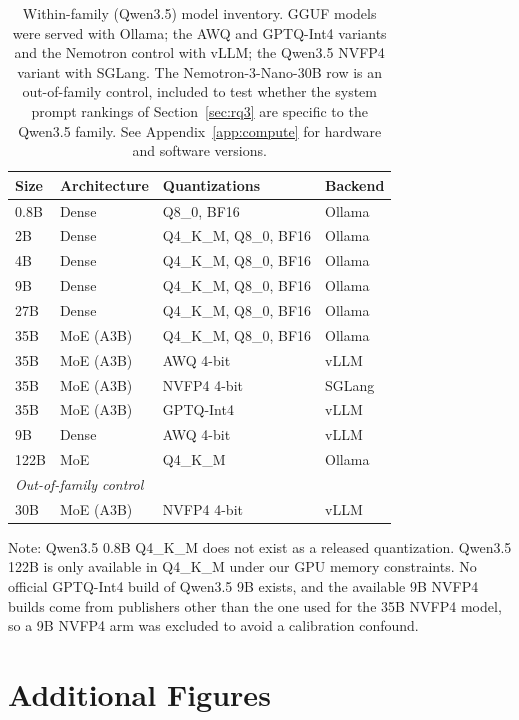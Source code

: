 \documentclass[11pt]{article}
\begin{document}
\begin{table}[h]
\centering
\caption{Within-family (Qwen3.5) model inventory. GGUF models were served with
  Ollama; the AWQ and GPTQ-Int4 variants and the Nemotron control with vLLM;
  the Qwen3.5 NVFP4 variant with SGLang. The Nemotron-3-Nano-30B row is an
  out-of-family control, included to
  test whether the system prompt rankings of Section~\ref{sec:rq3} are specific
  to the Qwen3.5 family. See Appendix~\ref{app:compute} for hardware and
  software versions.}
\label{tab:models_qwen35}
\small
\begin{tabular}{llll}
\toprule
Size & Architecture & Quantizations & Backend \\
\midrule
0.8B & Dense & Q8\_0, BF16 & Ollama \\
2B & Dense & Q4\_K\_M, Q8\_0, BF16 & Ollama \\
4B & Dense & Q4\_K\_M, Q8\_0, BF16 & Ollama \\
9B & Dense & Q4\_K\_M, Q8\_0, BF16 & Ollama \\
27B & Dense & Q4\_K\_M, Q8\_0, BF16 & Ollama \\
35B & MoE (A3B) & Q4\_K\_M, Q8\_0, BF16 & Ollama \\
35B & MoE (A3B) & AWQ 4-bit & vLLM \\
35B & MoE (A3B) & NVFP4 4-bit & SGLang \\
35B & MoE (A3B) & GPTQ-Int4 & vLLM \\
9B & Dense & AWQ 4-bit & vLLM \\
122B & MoE & Q4\_K\_M & Ollama \\
\midrule
\multicolumn{4}{l}{\emph{Out-of-family control}} \\
30B & MoE (A3B) & NVFP4 4-bit & vLLM \\
\bottomrule
\end{tabular}
\end{table}

Note: Qwen3.5 0.8B Q4\_K\_M does not exist as a released quantization.
Qwen3.5 122B is only available in Q4\_K\_M under our GPU memory constraints.
No official GPTQ-Int4 build of Qwen3.5 9B exists, and the available 9B
NVFP4 builds come from publishers other than the one used for the 35B
NVFP4 model, so a 9B NVFP4 arm was excluded to avoid a calibration
confound.


\clearpage
\section{Additional Figures}
\label{app:figures}
\end{document}

